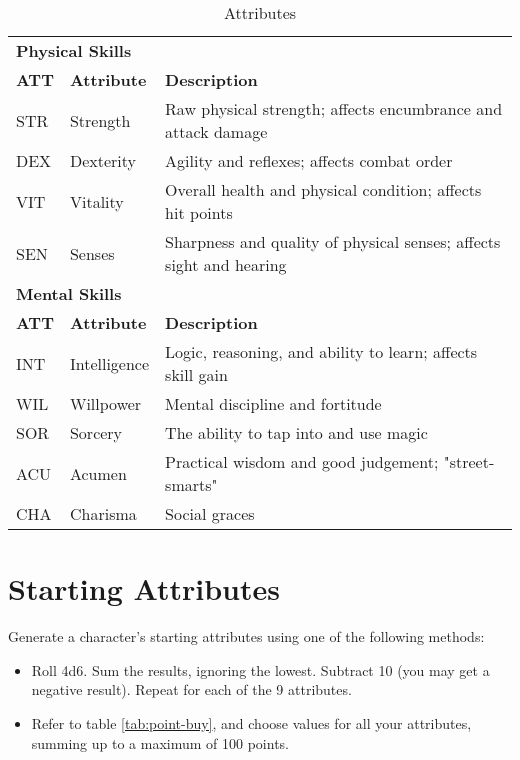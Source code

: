 
\begin{table}[h!]
    \begin{tabular}{l l l}
        \multicolumn{3}{l}{\bfseries{Physical Skills}} \\
        \bfseries{ATT} & \bfseries{Attribute} & \bfseries{Description} \\
        STR & Strength & Raw physical strength; affects encumbrance and attack damage \\
        DEX & Dexterity & Agility and reflexes; affects combat order \\
        VIT & Vitality & Overall health and physical condition; affects hit points \\
        SEN & Senses & Sharpness and quality of physical senses; affects sight and hearing \\
        \multicolumn{3}{l}{\bfseries{Mental Skills}} \\
        \bfseries{ATT} & \bfseries{Attribute} & \bfseries{Description} \\
        INT & Intelligence & Logic, reasoning, and ability to learn; affects skill gain \\
        WIL & Willpower & Mental discipline and fortitude \\
        SOR & Sorcery & The ability to tap into and use magic \\
        ACU & Acumen & Practical wisdom and good judgement; "street-smarts" \\
        CHA & Charisma & Social graces \\
    \end{tabular}
    \label{tab:attributes}
    \caption{Attributes}
\end{table}

\section{Starting Attributes}
Generate a character's starting attributes using one of the following methods:
\begin{itemize}
    \item Roll 4d6. Sum the results, ignoring the lowest. Subtract 10 (you may
        get a negative result). Repeat for each of the 9 attributes.
    \item Refer to table \ref{tab:point-buy}, and choose values for all your
        attributes, summing up to a maximum of 100 points.
\end{itemize}

